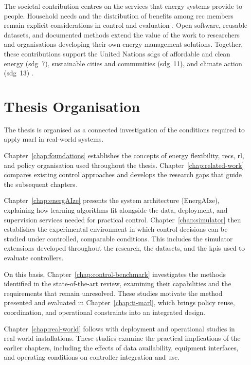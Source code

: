 The societal contribution centres on the services that energy systems provide to people. Household needs and the distribution of benefits among \gls{rec} members remain explicit considerations in control and evaluation \parencite{moret2019energycollectives}. Open software, reusable datasets, and documented methods extend the value of the work to researchers and organisations developing their own energy-management solutions. Together, these contributions support the United Nations \glspl{sdg} of affordable and clean energy (\gls{sdg}~7), sustainable cities and communities (\gls{sdg}~11), and climate action (\gls{sdg}~13) \parencite{un2015agenda2030}.

\section{Thesis Organisation}
\label{sec:intro-approach}
\label{sec:intro-graphical-abstract}
\label{sec:intro-objectives}
\label{sec:intro-organisation}

The thesis is organised as a connected investigation of the conditions required to apply \gls{marl} in real-world systems.

Chapter~\ref{chap:foundations} establishes the concepts of energy flexibility, \glspl{rec}, \gls{rl}, and policy organisation used throughout the thesis. Chapter~\ref{chap:related-work} compares existing control approaches and develops the research gaps that guide the subsequent chapters.

Chapter~\ref{chap:energAIze} presents the system architecture (EnergAIze), explaining how learning algorithms fit alongside the data, deployment, and supervision services needed for practical control. Chapter~\ref{chap:simulator} then establishes the experimental environment in which control decisions can be studied under controlled, comparable conditions. This includes the simulator extensions developed throughout the research, the datasets, and the \glspl{kpi} used to evaluate controllers.

On this basis, Chapter~\ref{chap:control-benchmark} investigates the methods identified in the state-of-the-art review, examining their capabilities and the requirements that remain unresolved. These studies motivate the method presented and evaluated in Chapter~\ref{chap:ti-marl}, which brings policy reuse, coordination, and operational constraints into an integrated design.

Chapter~\ref{chap:real-world} follows with deployment and operational studies in real-world installations. These studies examine the practical implications of the earlier chapters, including the effects of data availability, equipment interfaces, and operating conditions on controller integration and use.

